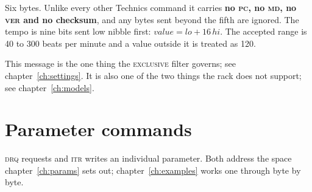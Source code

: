 \begin{center}
\end{center}

Six bytes. Unlike every other Technics command it carries \textbf{no \textsc{pc}, no
\textsc{md}, no \textsc{ver} and no checksum}, and any bytes sent beyond the fifth are
ignored. The tempo is nine bits sent low nibble first:
$\mathit{value} = \mathit{lo} + 16\,\mathit{hi}$. The accepted range is 40 to 300 beats per
minute and a value outside it is treated as 120.

This message is the one thing the \textsc{exclusive} filter governs; see
chapter~\ref{ch:settings}. It is also one of the two things the rack does not support; see
chapter~\ref{ch:models}.

\section{Parameter commands}
\textsc{drq} requests and \textsc{itr} writes an individual parameter. Both address the
space chapter~\ref{ch:params} sets out; chapter~\ref{ch:examples} works one through byte by
byte.
